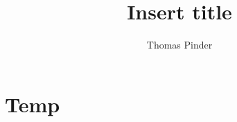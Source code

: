 \documentclass[12pt]{article}
\title{Insert title}
\author{Thomas Pinder}
\begin{document}
\maketitle
    
\section{Temp}
\cite{texbook}


 

\printglossaries
\end{document}
